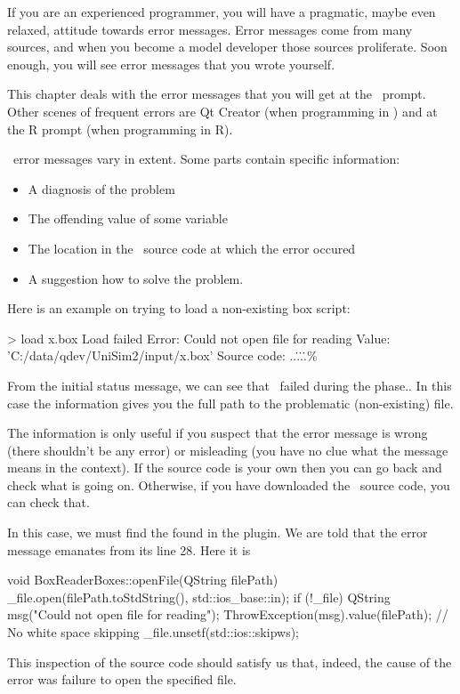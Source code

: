 If you are an experienced programmer, you will have a pragmatic, maybe even relaxed, attitude towards error messages. Error messages come from many sources, and when you become a model developer those sources proliferate. Soon enough, you will see error messages that you wrote yourself. 

This chapter deals with the error messages that you will get at the \US\ prompt. Other scenes of frequent errors are Qt Creator (when programming in \CPP) and at the R prompt (when programming in R).

\US\ error messages vary in extent. Some parts contain specific information:
\begin{itemize}
\item {} A diagnosis of the problem
\item {} The offending value of some variable
\item {} The location in the \CPP\ source code at which the error occured
\item {} A suggestion how to solve the problem.
\end{itemize}

Here is an example on trying to load a non-existing box script:
\begin{userror}
> load x.box
Load failed
Error: Could not open file for reading
Value: 'C:/data/qdev/UniSim2/input/x.box'
Source code: ..\..\..\..\src\plugins\%\brk%
\end{userror}

From the initial status message, we can see that \US\ failed during the  phase.. In this case the  information gives you the full path to the problematic (non-existing) file. 

The  information is only useful if you suspect that the error message is wrong (there shouldn't be any error) or misleading (you have no clue what the message means in the context). If the source code is your own then you can go back and check what is going on. Otherwise, if you have downloaded the \US\ source code, you can check that. 

In this case, we must find the  found in the 
 plugin. We are told that the error message emanates from its line 28. Here it is
\lstset{numbers=left, firstnumber=24}
\begin{cpp}
void BoxReaderBoxes::openFile(QString filePath) {
    _file.open(filePath.toStdString(), std::ios_base::in);
    if (!_file) {
        QString msg("Could not open file for reading");
        ThrowException(msg).value(filePath);
    }
    // No white space skipping
    _file.unsetf(std::ios::skipws);
}
\end{cpp}
\lstset{numbers=none, firstnumber=1}

This inspection of the source code should satisfy us that, indeed, the cause of the error was failure to open the specified file.
